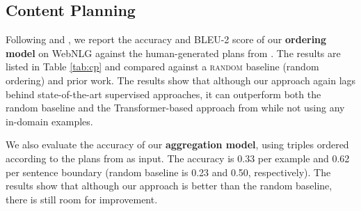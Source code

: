 \subsection{Content Planning}
\label{sec:eval_planning}

Following \citet{su2021plan} and \citet{zhao2020bridging}, we report the accuracy and BLEU-2 score of our \textbf{ordering model} on WebNLG against the human-generated plans from \citet{ferreira2018enriching}. The results are listed in Table \ref{tab:cp} and compared against a \textsc{random} baseline (random ordering) and prior work. The results show that although our approach again lags behind state-of-the-art supervised approaches, it can outperform both the random baseline and the Transformer-based approach from \citet{ferreira2019neural} while not using any in-domain examples.


We also evaluate the accuracy of our \textbf{aggregation model}, using triples ordered according to the plans from \citet{ferreira2018enriching} as input. The accuracy is 0.33 per example and 0.62 per sentence boundary (random baseline is 0.23 and 0.50, respectively). The results show that although our approach is better than the random baseline, there is still room for improvement.

